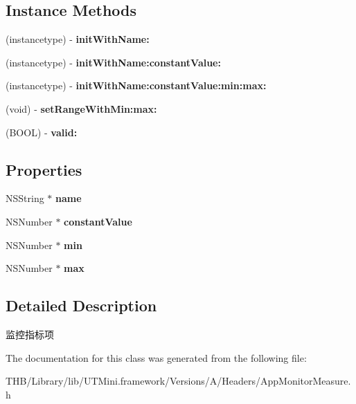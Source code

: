 \subsection*{Instance Methods}
\begin{DoxyCompactItemize}
\item 
\mbox{\label{interface_app_monitor_measure_a110268cb47a81b97d1bc9cb6a0616bdc}} 
(instancetype) -\/ {\bfseries init\+With\+Name\+:}
\item 
\mbox{\label{interface_app_monitor_measure_aa076aa73b486cf27334ceb397d26a0f3}} 
(instancetype) -\/ {\bfseries init\+With\+Name\+:constant\+Value\+:}
\item 
\mbox{\label{interface_app_monitor_measure_a1f4601db7cd4a364377adbca875e0e31}} 
(instancetype) -\/ {\bfseries init\+With\+Name\+:constant\+Value\+:min\+:max\+:}
\item 
\mbox{\label{interface_app_monitor_measure_af4c74d240e573fe5f11da463aa144c11}} 
(void) -\/ {\bfseries set\+Range\+With\+Min\+:max\+:}
\item 
\mbox{\label{interface_app_monitor_measure_ad4929a6178fff68871d29b6f5ba469e4}} 
(B\+O\+OL) -\/ {\bfseries valid\+:}
\end{DoxyCompactItemize}
\subsection*{Properties}
\begin{DoxyCompactItemize}
\item 
\mbox{\label{interface_app_monitor_measure_ad3685e1a62bf2071246698510a32d49c}} 
N\+S\+String $\ast$ {\bfseries name}
\item 
\mbox{\label{interface_app_monitor_measure_a200327079d1b79e17d3bdaa8c5a5e088}} 
N\+S\+Number $\ast$ {\bfseries constant\+Value}
\item 
\mbox{\label{interface_app_monitor_measure_a15f5244b9cea4c03af88197c187f41f1}} 
N\+S\+Number $\ast$ {\bfseries min}
\item 
\mbox{\label{interface_app_monitor_measure_a5e358e8a499faf9a6715a6ce6c96ae74}} 
N\+S\+Number $\ast$ {\bfseries max}
\end{DoxyCompactItemize}


\subsection{Detailed Description}
监控指标项 

The documentation for this class was generated from the following file\+:\begin{DoxyCompactItemize}
\item 
T\+H\+B/\+Library/lib/\+U\+T\+Mini.\+framework/\+Versions/\+A/\+Headers/App\+Monitor\+Measure.\+h\end{DoxyCompactItemize}
